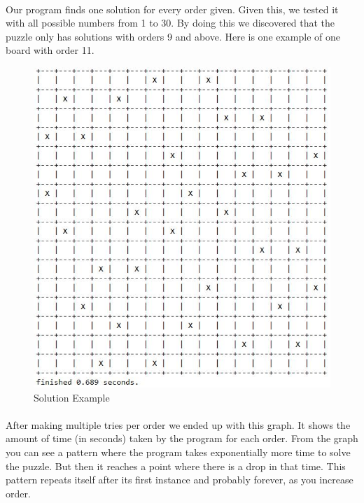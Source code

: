 \documentclass[runningheads]{llncs}
\begin{document}
\paragraph{}
Our program finds one solution for every order given. Given this, we tested it with all possible numbers from 1 to 30.
By doing this we discovered that the puzzle only has solutions with orders 9 and above. Here is one example of one board with order 11.

\begin{figure}
    \begin{center}
        \includegraphics[scale=0.35]{images/gap9.jpg}
        \caption{Solution Example} \label{fig3}
    \end{center}
\end{figure}

\pagebreak

\paragraph{}
After making multiple tries per order we ended up with this graph. It shows the amount of time (in seconds) taken by the program for
each order. From the graph you can see a pattern where the program takes exponentially more time to solve the puzzle. But then it
reaches a point where there is a drop in that time. This pattern repeats itself after its first instance and probably forever, as you increase order.
\end{document}
